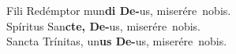 \def\mediant#1{\textbf{#1-}}

\newHymn

\JustHymnNum



\pointtrans

Fili Redémptor mun\mediant{di De}us, \hfill\mbox{miserére nobis.\hskip2.6cm}\\
Spíritus San\mediant{cte, De}us, \hfill\mbox{miserére nobis.\hskip2.6cm}\\
Sancta Trínitas, un\mediant{us De}us, \hfill\mbox{miserére nobis.\hskip2.6cm}\\



